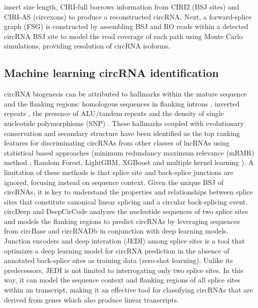 \documentclass[journal,review,submit,pdftex,moreauthors]{Definitions/mdpi}
\begin{document}
insert size length, CIRI-full borrows information from CIRI2 (BSJ sites) and CIRI-AS (circexons) to produce a reconstructed circRNA. Next, a forward-splice graph (FSG) is constructed by assembling BSJ and RO reads within a detected circRNA BSJ site to model the read coverage of each path using Monte Carlo simulations, providing resolution of circRNA isoforms. 

\subsection*{Machine learning circRNA identification}
circRNA biogenesis can be attributed to hallmarks within the mature sequence and the flanking regions: homologous sequences in flanking introns \cite{Ivanov2015Jan}, inverted repeats \cite{Dubin1995Dec}, the presence of ALU/tandem repeats \cite{Jeck2012Dec} and the density of single nucleotide polymorphisms (SNP) \cite{Thomas2014Aug}. These hallmarks coupled with evolutionary conservation and secondary structure have been identified as the top ranking features for discriminating circRNAs from other classes of lncRNAs using statistical based approaches (minimum redundancy maximum relevance (mRMR) method \cite{Chen2018Feb}, Random Forest, LightGBM, XGBoost \cite{StackCirRNAPred} and multiple kernel learning \cite{PredcircRNA}). A limitation of these methods is that splice site and back-splice junctions are ignored, focusing instead on sequence context. Given the unique BSJ of circRNAs, it is key to understand the properties and relationships between splice sites that constitute canonical linear splicing and a circular back-splicing event. circDeep \cite{circDeep} and DeepCirCode \cite{DeepCirCode} analyzes the nucleotide sequences of two splice sites and models the flanking regions to predict circRNAs by leveraging sequences from circBase and circRNADb in conjunction with deep learning models. Junction encoders and deep interation (JEDI) among splice sites \cite{JEDI} is a tool that optimizes a deep learning model for circRNA prediction in the absence of annotated back-splice sites as training data (zero-shot learning). Unlike its predecessors, JEDI is not limited to interrogating only two splice sites. In this way, it can model the sequence context and flanking regions of all splice sites within an transcript, making it an effective tool for classifying circRNAs that are derived from genes which also produce linear transcripts.
\end{document}
